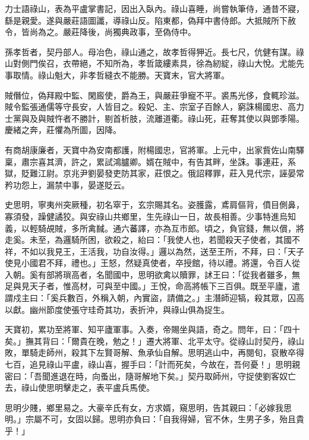 \begin{pinyinscope}
 力士語祿山，表為平盧掌書記，因出入臥內。祿山喜睡，尚嘗執筆侍，通昔不寢，繇是親愛。遂與嚴莊語圖讖，導祿山反。陷東都，偽拜中書侍郎。大抵賊所下赦令，皆尚為之。嚴莊降後，尚獨典政事，至偽侍中。



 孫孝哲者，契丹部人。母冶色，祿山通之，故孝哲得狎近。長七尺，伉健有謀。祿山對側門俟召，衣帶絕，不知所為，孝哲箴縷素具，徐為紉綻，祿山大悅。尤能先事取情。祿山魁大，非孝哲縫衣不能勝。天寶末，官大將軍。



 賊僭位，偽拜殿中監、閑廄使，爵為王，與嚴莊爭寵不平。裘馬光侈，食輒珍滋。賊令監張通儒等守長安，人皆目之。殺妃、主、宗室子百餘人，窮誅楊國忠、高力士黨與及與賊忤者不勝計，剔首析肢，流離道衢。祿山死，莊奪其使以與鄧季陽。慶緒之奔，莊懼為所圖，因降。



 有商胡康廉者，天寶中為安南都護，附楊國忠，官將軍。上元中，出家貲佐山南驛稟，肅宗喜其濟，許之，累試鴻臚卿。婿在賊中，有告其畔，坐誅。事連莊，系獄，貶難江尉。京兆尹劉晏發吏防其家，莊恨之。俄詔釋罪，莊入見代宗，誣晏常矜功怨上，漏禁中事，晏遂貶云。



 史思明，寧夷州突厥種，初名窣于，玄宗賜其名。姿臒露，鳶肩傴背，僨目側鼻，寡須發，躁健譎狡。與安祿山共鄉里，生先祿山一日，故長相善。少事特進烏知義，以輕騎覘賊，多所禽馘。通六蕃譯，亦為互市郎。頃之，負官錢，無以償，將走奚。未至，為邏騎所困，欲殺之，紿曰：「我使人也，若聞殺天子使者，其國不祥，不如以我見王，王活我，功自汝得。」邏以為然，送至王所，不拜，曰：「天子使見小國君不拜，禮也。」王怒，然疑真使者，卒授館，待以禮。將還，令百人從入朝。奚有部將瑣高者，名聞國中，思明欲禽以贖罪，訹王曰：「從我者雖多，無足與見天子者，惟高材，可與至中國。」王悅，命高將帳下三百俱。既至平廬，遣謂戍主曰：「奚兵數百，外稱入朝，內實盜，請備之。」主潛師迎犒，殺其眾，囚高以獻。幽州節度使張守珪奇其功，表折沖，與祿山俱為捉生。



 天寶初，累功至將軍、知平廬軍事。入奏，帝賜坐與語，奇之。問年，曰：「四十矣。」撫其背曰：「爾貴在晚，勉之！」遷大將軍、北平太守。從祿山討契丹，祿山敗，單騎走師州，殺其下左賢哥解、魚承仙自解。思明逃山中，再閱旬，裒散卒得七百，追見祿山平盧，祿山喜，握手曰：「計而死矣，今故在，吾何憂！」思明親密曰：「吾聞進退在時，向蚤出，隨哥解地下矣。」契丹取師州，守捉使劉客奴亡去，祿山使思明擊走之，表平盧兵馬使。



 思明少賤，鄉里易之。大豪辛氏有女，方求婿，窺思明，告其親曰：「必嫁我思明。」宗屬不可，女固以歸。思明亦負曰：「自我得婦，官不休，生男子多，殆且貴乎！」




\end{pinyinscope}
